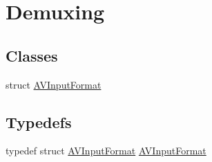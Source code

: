 \hypertarget{group__lavf__decoding}{}\section{Demuxing}
\label{group__lavf__decoding}
\subsection*{Classes}
\begin{DoxyCompactItemize}
\item 
struct \hyperlink{struct_a_v_input_format}{A\+V\+Input\+Format}
\end{DoxyCompactItemize}
\subsection*{Typedefs}
\begin{DoxyCompactItemize}
\item 
typedef struct \hyperlink{struct_a_v_input_format}{A\+V\+Input\+Format} \hyperlink{group__lavf__decoding_ga41ac82c86aa114943b700dac564d2508}{A\+V\+Input\+Format}
\end{DoxyCompactItemize}
